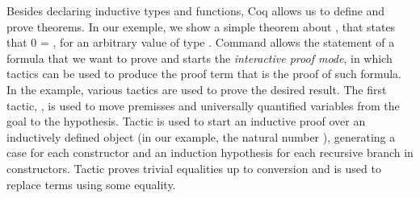 Besides declaring inductive types and functions, Coq allows us to
define and prove theorems. In our exemple, we show a simple theorem
about , that states that
  0 = , for an arbitrary value  of type
. Command  allows the statement of a
formula that we want to prove and starts the \emph{interactive proof mode}, 
in which tactics can be used to produce the proof term that
is the proof of such formula. In the example, various tactics are
used to prove the desired result.  The first tactic, , is
used to move premisses and universally quantified variables from the
goal to the hypothesis. Tactic  is used to start an inductive
proof over an inductively defined object (in our example,
the natural number ), generating a case for each constructor and
an induction hypothesis for each recursive branch in constructors.
Tactic  proves trivial equalities up to conversion and
 is used to replace terms using some equality. 


